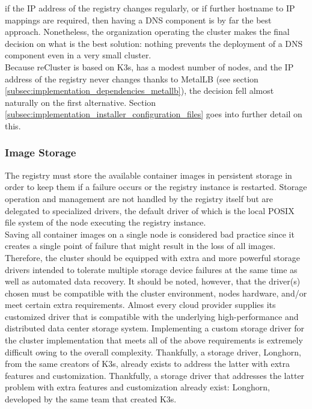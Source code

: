if the IP address of the registry changes regularly, or if further hostname to
IP mappings are required, then having a DNS component is by far the best approach.
Nonetheless, the organization operating the cluster makes the final decision on what
is the best solution: nothing prevents the deployment of a DNS component even in
a very small cluster. \\ %
Because reCluster is based on K3s, has a modest number of nodes, and the IP
address of the registry never changes thanks to MetalLB (see section \ref{subsec:implementation_dependencies_metallb}),
the decision fell almost naturally on the first alternative. Section
\ref{subsec:implementation_installer_configuration_files} goes into further
detail on this.

\subsubsection{Image Storage}
\label{subsubsec:implementation_dependencies_docker_registry_image_storage}

The registry must store the available container images in persistent storage in order
to keep them if a failure occurs or the registry instance is restarted. Storage
operation and management are not handled by the registry itself but are
delegated to specialized drivers, the default driver of which is the local POSIX
file system of the node executing the registry instance\cite{docker_registry_about}.
\\ %
Saving all container images on a single node is considered bad practice since it
creates a single point of failure that might result in the loss of all images. Therefore,
the cluster should be equipped with extra and more powerful storage drivers
intended to tolerate multiple storage device failures at the same time as well
as automated data recovery. It should be noted, however, that the driver(s)
chosen must be compatible with the cluster environment, nodes hardware, and/or
meet certain extra requirements. Almost every cloud provider supplies its customized
driver that is compatible with the underlying high-performance and distributed data
center storage system. Implementing a custom storage driver for the cluster
implementation that meets all of the above requirements is extremely difficult
owing to the overall complexity. Thankfully, a storage driver, Longhorn, from
the same creators of K3s, already exists to address the latter with extra features
and customization. Thankfully, a storage driver that addresses the latter problem
with extra features and customization already exist: Longhorn, developed by the same
team that created K3s.

